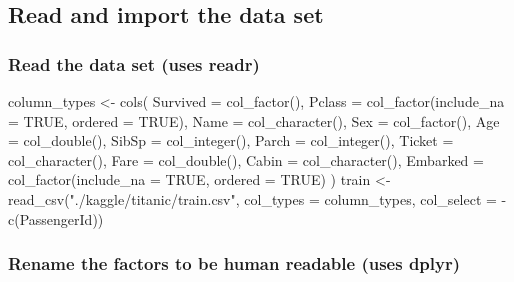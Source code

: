 \documentclass[
]{article}
\newenvironment{Shaded}{\begin{snugshade}}{\end{snugshade}}
\newcommand{\AttributeTok}[1]{\textcolor[rgb]{0.77,0.63,0.00}{#1}}
\newcommand{\ConstantTok}[1]{\textcolor[rgb]{0.00,0.00,0.00}{#1}}
\newcommand{\FunctionTok}[1]{\textcolor[rgb]{0.00,0.00,0.00}{#1}}
\newcommand{\NormalTok}[1]{#1}
\newcommand{\OtherTok}[1]{\textcolor[rgb]{0.56,0.35,0.01}{#1}}
\newcommand{\SpecialCharTok}[1]{\textcolor[rgb]{0.00,0.00,0.00}{#1}}
\newcommand{\StringTok}[1]{\textcolor[rgb]{0.31,0.60,0.02}{#1}}
\begin{document}
\hypertarget{read-and-import-the-data-set}{%
\subsection{Read and import the data
set}\label{read-and-import-the-data-set}}

\hypertarget{read-the-data-set-uses-readr}{%
\subsubsection{Read the data set (uses
readr)}\label{read-the-data-set-uses-readr}}

\begin{Shaded}
\begin{Highlighting}[]
\NormalTok{column\_types }\OtherTok{\textless{}{-}} \FunctionTok{cols}\NormalTok{(}
  \AttributeTok{Survived =} \FunctionTok{col\_factor}\NormalTok{(),}
  \AttributeTok{Pclass =} \FunctionTok{col\_factor}\NormalTok{(}\AttributeTok{include\_na =} \ConstantTok{TRUE}\NormalTok{, }\AttributeTok{ordered =} \ConstantTok{TRUE}\NormalTok{),}
  \AttributeTok{Name =} \FunctionTok{col\_character}\NormalTok{(),}
  \AttributeTok{Sex =} \FunctionTok{col\_factor}\NormalTok{(),}
  \AttributeTok{Age =} \FunctionTok{col\_double}\NormalTok{(),}
  \AttributeTok{SibSp =} \FunctionTok{col\_integer}\NormalTok{(),}
  \AttributeTok{Parch =} \FunctionTok{col\_integer}\NormalTok{(),}
  \AttributeTok{Ticket =} \FunctionTok{col\_character}\NormalTok{(),}
  \AttributeTok{Fare =} \FunctionTok{col\_double}\NormalTok{(),}
  \AttributeTok{Cabin =} \FunctionTok{col\_character}\NormalTok{(),}
  \AttributeTok{Embarked =} \FunctionTok{col\_factor}\NormalTok{(}\AttributeTok{include\_na =} \ConstantTok{TRUE}\NormalTok{, }\AttributeTok{ordered =} \ConstantTok{TRUE}\NormalTok{)}
\NormalTok{)}
\NormalTok{train }\OtherTok{\textless{}{-}} \FunctionTok{read\_csv}\NormalTok{(}\StringTok{"./kaggle/titanic/train.csv"}\NormalTok{,}
                  \AttributeTok{col\_types =}\NormalTok{ column\_types,}
                  \AttributeTok{col\_select =} \SpecialCharTok{{-}}\FunctionTok{c}\NormalTok{(PassengerId))}
\end{Highlighting}
\end{Shaded}

\hypertarget{rename-the-factors-to-be-human-readable-uses-dplyr}{%
\subsubsection{Rename the factors to be human readable (uses
dplyr)}\label{rename-the-factors-to-be-human-readable-uses-dplyr}}
\end{document}
